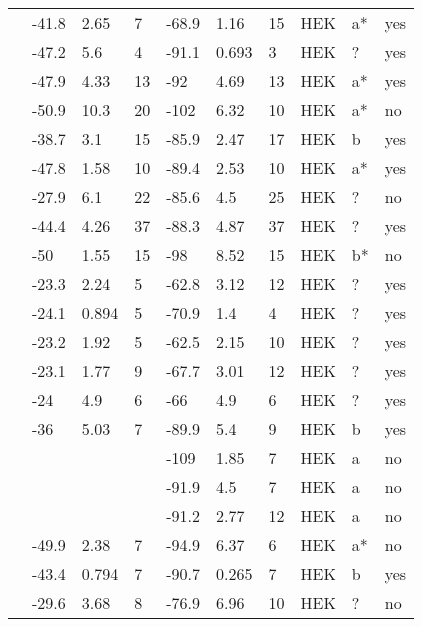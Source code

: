 \begin{longtable}{p{6cm}|lll|lll|lll}
\citet{Mohler2004MutationDB} & -41.8 & 2.65 & 7 & -68.9 & 1.16 & 15 & HEK & a* & yes \\
\citet{Mok2003MutationDB} & -47.2 & 5.6 & 4 & -91.1 & 0.693 & 3 & HEK & ? & yes \\
\citet{Moreau2013MutationDB} & -47.9 & 4.33 & 13 & -92 & 4.69 & 13 & HEK & a* & yes \\
\citet{Murphy2012MutationDB} & -50.9 & 10.3 & 20 & -102 & 6.32 & 10 & HEK & a* & no \\
\citet{Nakajima2015MutationDB} & -38.7 & 3.1 & 15 & -85.9 & 2.47 & 17 & HEK & b & yes \\
\citet{Nguyen2008MutationDB} & -47.8 & 1.58 & 10 & -89.4 & 2.53 & 10 & HEK & a* & yes \\
\citet{Olesen2012MutationDB} & -27.9 & 6.1 & 22 & -85.6 & 4.5 & 25 & HEK & ? & no \\
\citet{Otagiri2008MutationDB} & -44.4 & 4.26 & 37 & -88.3 & 4.87 & 37 & HEK & ? & yes \\
\citet{Pfahnl2007MutationDB} & -50 & 1.55 & 15 & -98 & 8.52 & 15 & HEK & b* & no \\
\citet{Rivolta2001MutationDB} & -23.3 & 2.24 & 5 & -62.8 & 3.12 & 12 & HEK & ? & yes \\
\citet{Rossenbacker2004MutationDB} & -24.1 & 0.894 & 5 & -70.9 & 1.4 & 4 & HEK & ? & yes \\
\citet{Ruan2007MutationDB} & -23.2 & 1.92 & 5 & -62.5 & 2.15 & 10 & HEK & ? & yes \\
\citet{Ruan2010MutationDB} & -23.1 & 1.77 & 9 & -67.7 & 3.01 & 12 & HEK & ? & yes \\
\citet{Saber2015MutationDB} & -24 & 4.9 & 6 & -66 & 4.9 & 6 & HEK & ? & yes \\
\citet{Samani2009MutationDB} & -36 & 5.03 & 7 & -89.9 & 5.4 & 9 & HEK & b & yes \\
\citet{Sarhan2009MutationDB} & && & -109 & 1.85 & 7 & HEK & a & no \\
\citet{Shinlapawittayatorn2011aMutationDB} & && & -91.9 & 4.5 & 7 & HEK & a & no \\
\citet{Shinlapawittayatorn2011bMutationDB} & && & -91.2 & 2.77 & 12 & HEK & a & no \\
\citet{Shirai2002MutationDB} & -49.9 & 2.38 & 7 & -94.9 & 6.37 & 6 & HEK & a* & no \\
\citet{Shuraih2007MutationDB} & -43.4 & 0.794 & 7 & -90.7 & 0.265 & 7 & HEK & b & yes \\
\citet{Shy2014MutationDB} & -29.6 & 3.68 & 8 & -76.9 & 6.96 & 10 & HEK & ? & no \\

\end{longtable}
